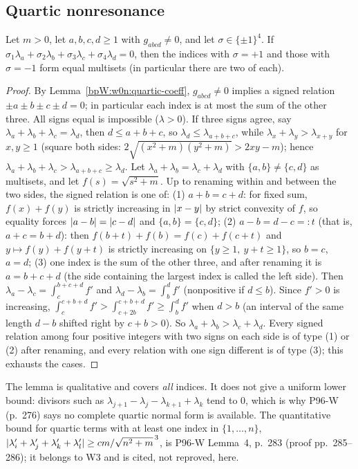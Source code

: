 \subsection{Quartic nonresonance}\label{bpW:w0n:nonres-sec}

\begin{lemma}\label{bpW:w0n:nonres}
Let $m>0$, let $a,b,c,d\ge1$ with $g_{abcd}\neq0$, and let $\sigma\in\{\pm1\}^4$. If
$\sigma_1\lambda_a+\sigma_2\lambda_b+\sigma_3\lambda_c+\sigma_4\lambda_d=0$, then the indices with $\sigma=+1$ and
those with $\sigma=-1$ form equal multisets (in particular there are two of each).
\end{lemma}

\begin{proof}
By Lemma~\ref{bpW:w0n:quartic-coeff}, $g_{abcd}\ne0$ implies a signed relation $\pm a\pm b\pm c\pm d=0$; in
particular each index is at most the sum of the other three.
\label{stepW:w0n:31}
All signs equal is impossible ($\lambda>0$). If three signs agree, say $\lambda_a+\lambda_b+\lambda_c=\lambda_d$,
then $d\le a+b+c$, so $\lambda_d\le\lambda_{a+b+c}$, while $\lambda_x+\lambda_y>\lambda_{x+y}$ for $x,y\ge1$
(square both sides: $2\sqrt{(x^2+m)(y^2+m)}>2xy-m$); hence $\lambda_a+\lambda_b+\lambda_c>\lambda_{a+b+c}\ge\lambda_d$.
\label{stepW:w0n:22}
Let $\lambda_a+\lambda_b=\lambda_c+\lambda_d$ with $\{a,b\}\ne\{c,d\}$ as multisets, and let $f(s)=\sqrt{s^2+m}$.
Up to renaming within and between the two sides, the signed relation is one of:
(1) $a+b=c+d$: for fixed sum, $f(x)+f(y)$ is strictly increasing in $\lvert x-y\rvert$ by strict convexity of $f$, so
equality forces $\lvert a-b\rvert=\lvert c-d\rvert$ and $\{a,b\}=\{c,d\}$;
(2) $a-b=d-c=:t$ (that is, $a+c=b+d$): then $f(b+t)+f(b)=f(c)+f(c+t)$ and $y\mapsto f(y)+f(y+t)$ is strictly
increasing on $\{y\ge1,\ y+t\ge1\}$, so $b=c$, $a=d$;
(3) one index is the sum of the other three, and after renaming it is $a=b+c+d$ (the side containing the largest
index is called the left side). Then $\lambda_a-\lambda_c=\int_c^{b+c+d}f'$ and $\lambda_d-\lambda_b=\int_b^df'$
(nonpositive if $d\le b$). Since $f'>0$ is increasing, $\int_c^{c+b+d}f'>\int_{c+2b}^{c+b+d}f'\ge\int_b^df'$ when
$d>b$ (an interval of the same length $d-b$ shifted right by $c+b>0$). So
$\lambda_a+\lambda_b>\lambda_c+\lambda_d$.
Every signed relation among four positive integers with two signs on each side is of type (1) or (2) after renaming,
and every relation with one sign different is of type (3); this exhausts the cases.
\end{proof}
\begin{remark}\label{bpW:w0n:nonres-remark}
The lemma is qualitative and covers \emph{all} indices. It does not give a uniform lower bound: divisors such as
$\lambda_{j+1}-\lambda_j-\lambda_{k+1}+\lambda_k$ tend to $0$, which is why P96-W (p.~276) says no complete quartic
normal form is available. The quantitative bound for quartic terms with at least one index in $\{1,\dots,n\}$,
$\lvert \lambda'_i+\lambda'_j+\lambda'_k+\lambda'_l\rvert\ge cm/\sqrt{n^2+m}^{\,3}$, is P96-W Lemma~4, p.~283 (proof
pp.~285--286); it belongs to W3 and is cited, not reproved, here.
\end{remark}

